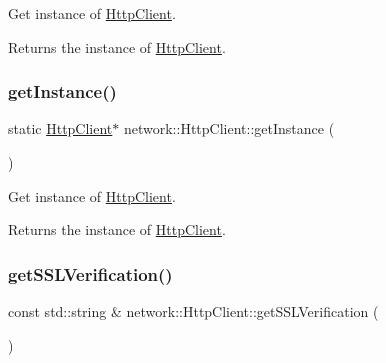Get instance of \hyperlink{classnetwork_1_1HttpClient}{Http\+Client}.

\begin{DoxyReturn}{Returns}
the instance of \hyperlink{classnetwork_1_1HttpClient}{Http\+Client}. 
\end{DoxyReturn}
\mbox{\label{classnetwork_1_1HttpClient_a545f440ef7035370d2d0731aa9935bea}} 
\subsubsection{\texorpdfstring{get\+Instance()}{getInstance()}\hspace{0.1cm}{\footnotesize\ttfamily [2/2]}}
{\footnotesize\ttfamily static \hyperlink{classnetwork_1_1HttpClient}{Http\+Client}$\ast$ network\+::\+Http\+Client\+::get\+Instance (\begin{DoxyParamCaption}{ }\end{DoxyParamCaption})\hspace{0.3cm}{\ttfamily [static]}}

Get instance of \hyperlink{classnetwork_1_1HttpClient}{Http\+Client}.

\begin{DoxyReturn}{Returns}
the instance of \hyperlink{classnetwork_1_1HttpClient}{Http\+Client}. 
\end{DoxyReturn}
\mbox{\label{classnetwork_1_1HttpClient_a80bc5e78ec453afdc746c0580e414ccc}} 
\subsubsection{\texorpdfstring{get\+S\+S\+L\+Verification()}{getSSLVerification()}\hspace{0.1cm}{\footnotesize\ttfamily [1/2]}}
{\footnotesize\ttfamily const std\+::string \& network\+::\+Http\+Client\+::get\+S\+S\+L\+Verification (\begin{DoxyParamCaption}{ }\end{DoxyParamCaption})}

